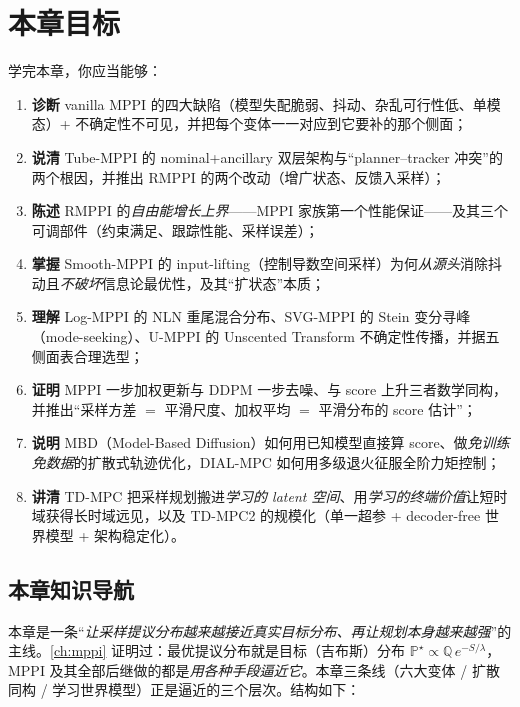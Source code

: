 \section*{本章目标}
学完本章，你应当能够：
\begin{enumerate}
  \item \textbf{诊断} vanilla MPPI 的四大缺陷（模型失配脆弱、抖动、杂乱可行性低、单模态）+ 不确定性不可见，并把每个变体一一对应到它要补的那个侧面；
  \item \textbf{说清} Tube-MPPI 的 nominal+ancillary 双层架构与“planner--tracker 冲突”的两个根因，并推出 RMPPI 的两个改动（增广状态、反馈入采样）；
  \item \textbf{陈述} RMPPI 的\emph{自由能增长上界}——MPPI 家族第一个性能保证——及其三个可调部件（约束满足、跟踪性能、采样误差）；
  \item \textbf{掌握} Smooth-MPPI 的 input-lifting（控制导数空间采样）为何\emph{从源头}消除抖动且\emph{不破坏}信息论最优性，及其“扩状态”本质；
  \item \textbf{理解} Log-MPPI 的 NLN 重尾混合分布、SVG-MPPI 的 Stein 变分寻峰（mode-seeking）、U-MPPI 的 Unscented Transform 不确定性传播，并据五侧面表合理选型；
  \item \textbf{证明} MPPI 一步加权更新与 DDPM 一步去噪、与 score 上升三者数学同构，并推出“采样方差 $=$ 平滑尺度、加权平均 $=$ 平滑分布的 score 估计”；
  \item \textbf{说明} MBD（Model-Based Diffusion）如何用已知模型直接算 score、做\emph{免训练免数据}的扩散式轨迹优化，DIAL-MPC 如何用多级退火征服全阶力矩控制；
  \item \textbf{讲清} TD-MPC 把采样规划搬进\emph{学习的 latent 空间}、用\emph{学习的终端价值}让短时域获得长时域远见，以及 TD-MPC2 的规模化（单一超参 + decoder-free 世界模型 + 架构稳定化）。
\end{enumerate}

\subsection*{本章知识导航}
本章是一条“\emph{让采样提议分布越来越接近真实目标分布、再让规划本身越来越强}”的主线。\cref{ch:mppi} 证明过：最优提议分布就是目标（吉布斯）分布 $\mathbb{P}^\star\propto\mathbb{Q}\,e^{-S/\lambda}$，MPPI 及其全部后继做的都是\emph{用各种手段逼近它}。本章三条线（六大变体 / 扩散同构 / 学习世界模型）正是逼近的三个层次。结构如下：

